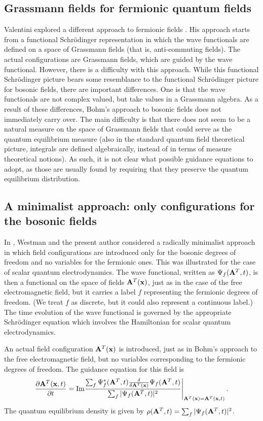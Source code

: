 \documentclass[11pt]{article}
\begin{document}
\subsection{Grassmann fields for fermionic quantum fields}
Valentini explored a different approach to fermionic fields \cite{valentini92,valentini96}. His approach starts from a functional Schr\"odinger representation in which the wave functionals are defined on a space of Grassmann fields (that is, anti-commuting fields). The actual configurations are Grassmann fields, which are guided by the wave functional. However, there is a difficulty with this approach. While this functional Schr\"odinger picture bears some resemblance to the functional Schr\"odinger picture for bosonic fields, there are important differences. One is that the wave functionals are not complex valued, but take values in a Grassmann algebra. As a result of these differences, Bohm's approach to bosonic fields does not immediately carry over. The main difficulty is that there does not seem to be a natural measure on the space of Grassmann fields that could serve as the quantum equilibrium measure (also in the standard quantum field theoretical picture, integrals are defined algebraically, instead of in terms of measure theoretical notions). As such, it is not clear what possible guidance equations to adopt, as those are usually found by requiring that they preserve the quantum equilibrium distribution.


\subsection{A minimalist approach: only configurations for the bosonic fields}
In \cite{struyve06,struyve07b}, Westman and the present author considered a radically minimalist approach in which field configurations are introduced only for the bosonic degrees of freedom and no variables for the fermionic ones. This was illustrated for the case of scalar quantum electrodynamics. The wave functional, written as $\Psi_f({\bf A}^T,t)$, is then a functional on the space of fields ${\bf A}^T({\bf x})$, just as in the case of the free electromagnetic field, but it carries a label $f$ representing the fermionic degrees of freedom. (We treat $f$ as discrete, but it could also represent a continuous label.) The time evolution of the wave functional is governed by the appropriate Schr\"odinger equation which involves the Hamiltonian for scalar quantum electrodynamics. 

An actual field configuration ${\bf A}^T({\bf x})$ is introduced, just as in Bohm's approach to the free electromagnetic field, but no variables corresponding to the fermionic degrees of freedom. The guidance equation for this field is
\begin{equation}
\frac{\partial {\bf A}^T ({\bf x},t)}{\partial t} = {\textrm{Im}} \frac{\sum_f \Psi^*_f({\bf A}^T,t) \frac{\delta }{\delta {\bf A}^T({\bf x})} \Psi_f({\bf A}^T,t) }{\sum_f |\Psi_f({\bf A}^T,t)|^2}\Bigg|_{{\bf A}^T({\bf x}) = {\bf A}^T ({\bf x},t)} \,.
\label{7}
\end{equation}
The quantum equilibrium density is given by $\rho({\bf A}^T,t)=\sum_f |\Psi_f({\bf A}^T,t)|^2$.
\end{document}
